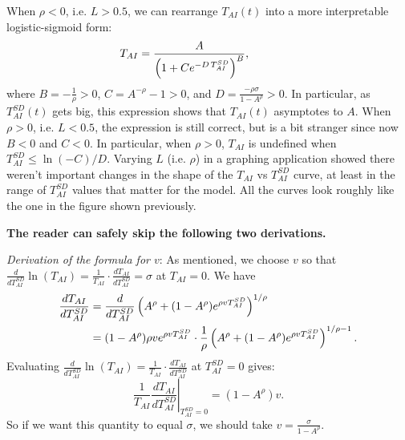 \documentclass{article}
\theoremstyle{definition}
\begin{document}
When $\rho < 0$, i.e. $L > 0.5$, we can rearrange $T_{AI}(t)$ into a more interpretable logistic-sigmoid form:
\begin{equation} \label{strange logistic}
T_{AI} = \frac{A}{\left(1+Ce^{-D \, T_{AI}^{SD}} \right)^{B}}, \hspace*{1.5cm}
\end{equation}
where $B = -\frac{1}{\rho} > 0$, $C = A^{-\rho} - 1 > 0$, and $D = \frac{-\rho \sigma}{1-A^\rho} > 0$. In particular, as $T_{AI}^{SD}(t)$ gets big, this expression shows that $T_{AI}(t)$ asymptotes to $A$. When $\rho > 0$, i.e. $L < 0.5$, the expression is still correct, but is a bit stranger since now $B < 0$ and $C < 0$. In particular, when $\rho > 0$, $T_{AI}$ is undefined when $T_{AI}^{SD} \leq \ln(-C)/D$. Varying $L$ (i.e. $\rho$) in a graphing application showed there weren't important changes in the shape of the $T_{AI}$ vs $T_{AI}^{SD}$ curve, at least in the range of $T_{AI}^{SD}$ values that matter for the model. All the curves look roughly like the one in the figure shown previously.

\textbf{The reader can safely skip the following two derivations.}

\textit{Derivation of the formula for $v$}: As mentioned, we choose $v$ so that $\frac{d}{d T_{AI}^{SD}} \ln(T_{AI}) = \frac{1}{T_{AI}} \cdot \frac{d T_{AI}}{d T_{AI}^{SD}} = \sigma$ at $T_{AI} = 0$. We have
\begin{equation} \label{dTAI}
\begin{aligned}
\frac{d T_{AI}}{d T_{AI}^{SD}} &= \frac{d}{d T_{AI}^{SD}} \left(A^\rho + (1-A^\rho) e^{\rho v T_{AI}^{SD}}\right)^{1/\rho} \hspace*{1.5cm}\\
&= (1-A^\rho) \rho v e^{\rho v T_{AI}^{SD}} \cdot \frac{1}{\rho} \left(A^\rho + (1-A^\rho) e^{\rho v T_{AI}^{SD}}\right)^{1/\rho - 1}.
\end{aligned}
\end{equation}
Evaluating $\frac{d}{d T_{AI}^{SD}} \ln(T_{AI}) = \frac{1}{T_{AI}} \cdot \frac{d T_{AI}}{d T_{AI}^{SD}}$ at $T_{AI}^{SD} = 0$ gives:
\[ \left.\frac{1}{T_{AI}}\frac{d T_{AI}}{d T_{AI}^{SD}}\right|_{T_{AI}^{SD} = 0} = (1-A^\rho) v.\]
So if we want this quantity to equal $\sigma$, we should take $v = \frac{\sigma}{1-A^\rho}$.
\end{document}
